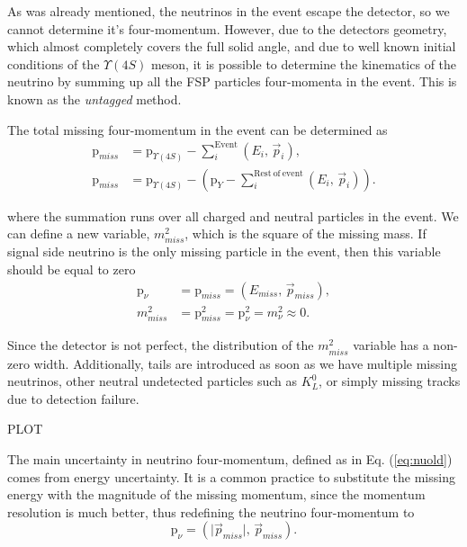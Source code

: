 \documentclass[oneside,a4paper,openany,12pt]{scrbook}
\begin{document}
As was already mentioned, the neutrinos in the event escape the detector, so we cannot determine it's four-momentum. However, due to the detectors geometry, which almost completely covers the full solid angle, and due to well known initial conditions of the $\Upsilon(4S)$ meson, it is possible to determine the kinematics of the neutrino by summing up all the FSP particles four-momenta in the event. This is known as the \textit{untagged} method.

The total missing four-momentum in the event can be determined as
\begin{align}
\mathrm{p}_{miss} &= \mathrm{p}_{\Upsilon(4S)} - \sum_i^{\mathrm{Event}}\left(E_i,\,\vec{p}_i \right),\\
\mathrm{p}_{miss} &= \mathrm{p}_{\Upsilon(4S)} - \left(\mathrm{p}_{Y} -\sum_i^{\mathrm{Rest~of~event}}\left(E_i,\,\vec{p}_i \right)\right).
\end{align}

where the summation runs over all charged and neutral particles in the event. We can define a new variable, $m_{miss}^2$, which is the square of the missing mass. If signal side neutrino is the only missing particle in the event, then this variable should be equal to zero
\begin{align}
\label{eq:nuold}
\mathrm{p}_\nu &= \mathrm{p}_{miss} = \left(E_{miss},\,\vec{p}_{miss} \right),\\
m_{miss}^2 &= \mathrm{p}_{miss}^2 = \mathrm{p}_{\nu}^2 = m_\nu^2 \approx 0.
\end{align}

Since the detector is not perfect, the distribution of the $m_{miss}^2$ variable has a non-zero width. Additionally, tails are introduced as soon as we have multiple missing neutrinos, other neutral undetected particles such as $K_L^0$, or simply missing tracks due to detection failure.

\begin{center}
PLOT
\end{center}

The main uncertainty in neutrino four-momentum, defined as in Eq. (\ref{eq:nuold}) comes from energy uncertainty. It is a common practice to substitute the missing energy with the magnitude of the missing momentum, since the momentum resolution is much better, thus redefining the neutrino four-momentum to
\begin{equation}
\label{eq:nunew}
\mathrm{p}_\nu = \left(\vert \vec{p}_{miss} \vert,\,\vec{p}_{miss} \right).
\end{equation}
\end{document}
